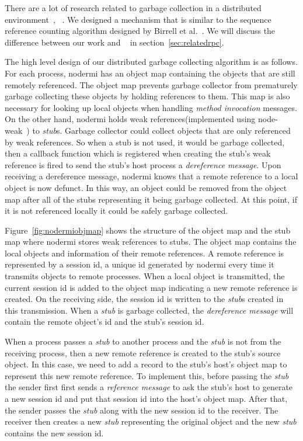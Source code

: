 There are a lot of research related to garbage collection in a distributed
environment~\cite{abdullahi1998garbage}, ~\cite{birrell1993distributed}.
We designed a mechanism that is similar to the sequence reference counting algorithm
designed by Birrell et al.~\cite{birrell1993distributed}.
We will discuss the difference between our work and ~\cite{birrell1993distributed}
in section~\ref{sec:relatedrpc}.

The high level design of our distributed garbage collecting
algorithm is as follows.
For each process, nodermi has an object map containing the objects
that are still remotely referenced.
The object map prevents garbage collector from prematurely garbage collecting
these objects by holding references to them.
This map is also necessary for looking up local objects
when handling \emph{method invocation} messages.
On the other hand, nodermi holds weak references(implemented using node-weak~\cite{nodeweak})
to \emph{stub}s.
Garbage collector could collect objects that are only
referenced by weak references.
So when a stub is not used, it would be garbage collected,
then a callback function which is registered when creating
the stub's weak reference is fired to
send the stub's host process a \emph{dereference message}.
Upon receiving a dereference message,
nodermi knows that a remote reference to a local object
is now defunct.
In this way, an object could be removed from the object map after
all of the stubs representing it being garbage collected.
At this point, if it is not referenced locally it could
be safely garbage collected.


\nodermiobjmapfig{}

Figure~\ref{fig:nodermiobjmap} shows the structure of
the object map and the stub map
where nodermi stores weak references to stubs.
The object map contains the local objects and information of
their remote references.
A remote reference is represented by a session id,
a unique id generated by nodermi every time it transmits objects
to remote processes.
When a local object is transmitted, the current session id is added to
the object map indicating a new remote reference is created.
On the receiving side, the session id is written to
the \emph{stub}s created in this transmission.
When a \emph{stub} is garbage collected,
the \emph{dereference message} will contain
the remote object's id and the stub's session id.


When a process passes a \emph{stub} to another process
and the \emph{stub} is not from the receiving process,
then a new remote reference is created to the stub's source object.
In this case, 
we need to add a record to the stub's host's object map to represent
this new remote reference.
To implement this,
before passing the \emph{stub}
the sender first first sends a \emph{reference message} to
ask the stub's host to generate a new session id
and put that session id into the host's object map.
After that,
the sender passes the \emph{stub} along with the new session id
to the receiver.
The receiver then creates a new \emph{stub} 
representing the original object and the new \emph{stub}
contains the new session id.

